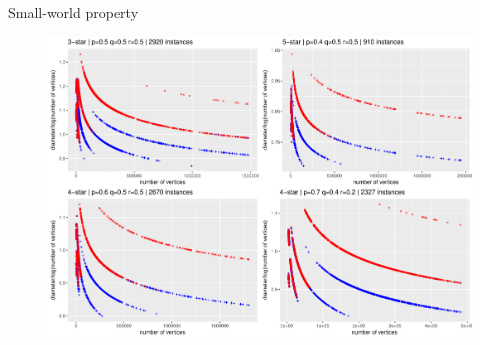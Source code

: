 \begin{block}{Small-world property}
\begin{figure}
\includegraphics[width=0.8\linewidth]{./fig/csilldiam4.pdf}
\end{figure}
\end{block}
